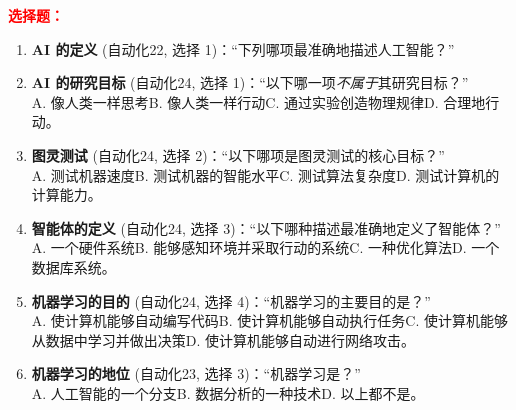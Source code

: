 ﻿\documentclass[../main.tex]{subfiles}
\begin{document}
\noindent\textbf{\textcolor{red}{选择题：}}
\begin{enumerate}[itemsep=0.45em, topsep=0.2em, leftmargin=1.5em]
    \item \textbf{AI 的定义} \textcolor{autoclassgreen}{(自动化22, 选择 1)}：``下列哪项最准确地描述人工智能？''\\
    

    \item \textbf{AI 的研究目标} \textcolor{autoclassgreen}{(自动化24, 选择 1)}：``以下哪一项\emph{不属于}其研究目标？''\\
    A. 像人类一样思考\quad B. 像人类一样行动\quad C. 通过实验创造物理规律\quad D. 合理地行动。 

    \item \textbf{图灵测试} \textcolor{autoclassgreen}{(自动化24, 选择 2)}：``以下哪项是图灵测试的核心目标？''\\
    A. 测试机器速度\quad B. 测试机器的智能水平\quad C. 测试算法复杂度\quad D. 测试计算机的计算能力。 

    \item \textbf{智能体的定义} \textcolor{autoclassgreen}{(自动化24, 选择 3)}：``以下哪种描述最准确地定义了智能体？''\\
    A. 一个硬件系统\quad B. 能够感知环境并采取行动的系统\quad C. 一种优化算法\quad D. 一个数据库系统。 

    \item \textbf{机器学习的目的} \textcolor{autoclassgreen}{(自动化24, 选择 4)}：``机器学习的主要目的是？''\\
    A. 使计算机能够自动编写代码\quad B. 使计算机能够自动执行任务\quad C. 使计算机能够从数据中学习并做出决策\quad D. 使计算机能够自动进行网络攻击。 

    \item \textbf{机器学习的地位} \textcolor{autoclassgreen}{(自动化23, 选择 3)}：``机器学习是？''\\
    A. 人工智能的一个分支\quad B. 数据分析的一种技术\quad {}\quad D. 以上都不是。 


\end{enumerate}
\end{document}
